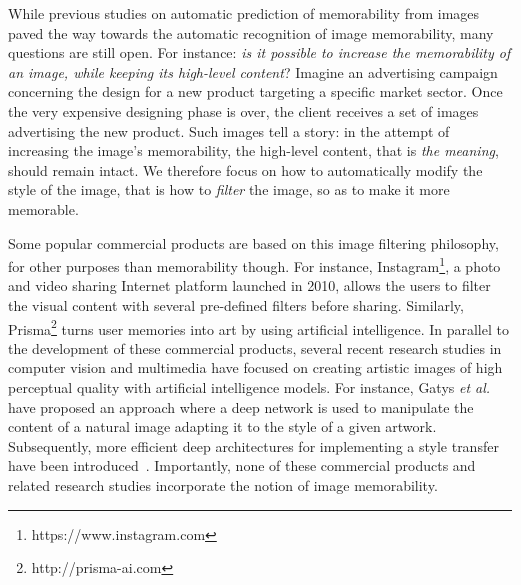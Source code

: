 \documentclass{sig-alternate-05-2015}
\begin{document}
While previous studies on automatic prediction of memorability from images paved the way towards the automatic recognition of image memorability, many questions are still open. For instance: \textit{is it possible to increase the memorability of an image, while keeping its high-level content}? Imagine an advertising campaign concerning the design for a new product targeting a specific market sector. Once the very expensive designing phase is over, the client receives a set of images advertising the new product. Such images tell a story: in the attempt of increasing the image's memorability, the high-level content, that is \textit{the meaning}, should remain intact. We therefore focus on how to automatically modify the style of the image, that is how to \textit{filter} the image, so as to make it more memorable.

Some popular commercial products are based on this image filtering philosophy, for other purposes than memorability though. For instance, Instagram\footnote{https://www.instagram.com}, a photo and video sharing Internet platform launched in 2010, allows the users to filter the visual content with several pre-defined filters before sharing. %
Similarly, Prisma\footnote{http://prisma-ai.com} %
turns user memories into art by using artificial intelligence. %
In parallel to the development of these commercial products, several recent research studies in computer vision and multimedia have focused on creating artistic images of high perceptual quality with artificial intelligence models. For instance, Gatys \textit{et al.}~\cite{gatys2016image} have proposed an approach where a deep network is used to manipulate the content of a natural image adapting it to the style of a given artwork. Subsequently, more efficient deep architectures for implementing a style transfer have been introduced~\cite{ulyanov2016texture}. Importantly, none of these commercial products and related research studies incorporate the notion of image memorability. 
 
\end{document}
